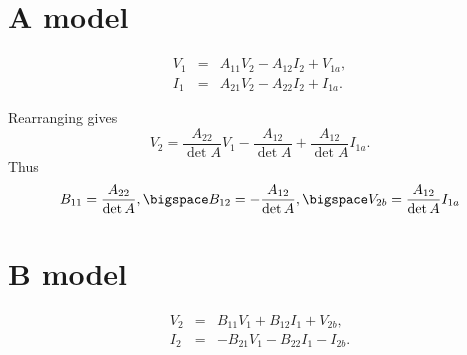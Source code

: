 \documentclass[a4paper, 12pt]{article}
\begin{document}
\section{A model}

\begin{eqnarray}
  V_1 & = & A_{11} V_2 - A_{12} I_2 + V_{1a}, \\
  I_1 & = & A_{21} V_2 - A_{22} I_2 + I_{1a}.
\end{eqnarray}

Rearranging gives
%
\begin{equation}
 V_2 = \frac{A_{22}}{\det{A}} V_1 - \frac{A_{12}}{\det{A}} + \frac{A_{12}}{\det{A}} I_{1a}. 
\end{equation}
%
Thus
%
\begin{equation}
 B_{11} = \frac{A_{22}}{\det{A}}, \bigspace B_{12} = -\frac{A_{12}}{\det{A}}, \bigspace V_{2b} = \frac{A_{12}}{\det{A}} I_{1a} 
\end{equation}


\section{B model}

\begin{eqnarray}
\label{eqn:BV2}
  V_2 & = & B_{11} V_1 + B_{12} I_1 + V_{2b}, \\
  I_2 & = & -B_{21} V_1 - B_{22} I_1 - I_{2b}.
\label{eqn:BI2}
\end{eqnarray}
\end{document}
